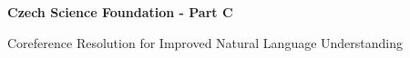 \documentclass[11pt,american,oneside]{article}
\begin{document}
{\Large  \noindent \textbf{Czech Science Foundation - Part C}}

\vspace{.25cm}
\begin{minipage}{.75\textwidth}
{\noindent

    \begin{description}[style=unboxed,leftmargin=0cm,labelindent=0cm]
         Coreference Resolution for Improved Natural Language Understanding
    \end{description}

}
\end{minipage}




\end{document}
